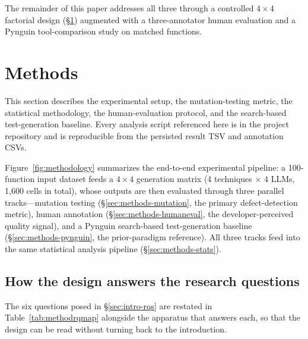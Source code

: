 \documentclass[smallextended]{svjour3}
\begin{document}
\noindent The remainder of this paper addresses all three through a
controlled $4 \times 4$ factorial design (\S\ref{sec:methods})
augmented with a three-annotator human evaluation and a Pynguin
tool-comparison study on matched functions.

\section{Methods}\label{sec:methods}
This section describes the experimental setup, the mutation-testing
metric, the statistical methodology, the human-evaluation protocol,
and the search-based test-generation baseline. Every analysis script
referenced here is in the project repository and is reproducible
from the persisted result TSV and annotation CSVs.

Figure~\ref{fig:methodology} summarizes the end-to-end experimental
pipeline: a 100-function input dataset feeds a $4 \times 4$ generation matrix (4 techniques $\times$ 4 LLMs, 1{,}600 cells in total), whose outputs are then evaluated through three parallel
tracks—mutation testing (\S\ref{sec:methods-mutation}, the
primary defect-detection metric), human annotation
(\S\ref{sec:methods-humaneval}, the developer-perceived quality
signal), and a Pynguin search-based test-generation baseline
(\S\ref{sec:methods-pynguin}, the prior-paradigm reference). All
three tracks feed into the same statistical analysis pipeline
(\S\ref{sec:methods-stats}).

\subsection{How the design answers the research
questions}\label{sec:methods-rqmap}

The six questions posed in \S\ref{sec:intro-rqs} are restated in
Table~\ref{tab:methodrqmap} alongside the apparatus that answers
each, so that the design can be read without turning back to the
introduction.
\end{document}
